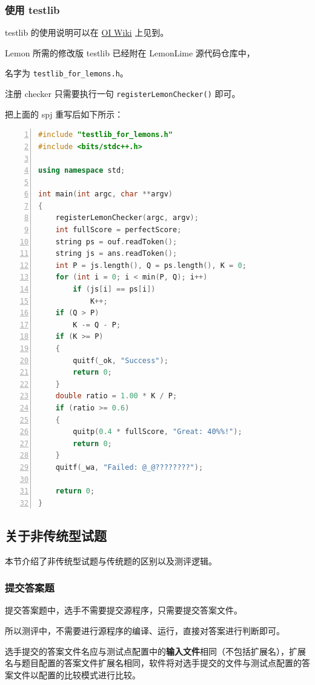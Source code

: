 \documentclass[UTF-8]{ctexart}
\begin{document}
			\subsubsection{使用 testlib}
			
				testlib 的使用说明可以在 \href{https://oi-wiki.org/intro/testlib/}{OI Wiki} 上见到。
				
				Lemon 所需的修改版 testlib 已经附在 LemonLime 源代码仓库中，
				
				名字为 \texttt{testlib\_for\_lemons.h}。
				
				注册 checker 只需要执行一句 \texttt{registerLemonChecker()} 即可。
				
				把上面的 spj 重写后如下所示：
		
				\begin{lstlisting}[language={C++},numbers=left,showspaces=false,showstringspaces=false,frame=shadowbox,basicstyle=\ttfamily]
#include "testlib_for_lemons.h"
#include <bits/stdc++.h>

using namespace std;

int main(int argc, char **argv)
{
	registerLemonChecker(argc, argv);
	int fullScore = perfectScore;
	string ps = ouf.readToken();
	string js = ans.readToken();
	int P = js.length(), Q = ps.length(), K = 0;
	for (int i = 0; i < min(P, Q); i++)
		if (js[i] == ps[i])
			K++;
	if (Q > P)
		K -= Q - P;
	if (K >= P)
	{
		quitf(_ok, "Success");
		return 0;
	}
	double ratio = 1.00 * K / P;
	if (ratio >= 0.6)
	{
		quitp(0.4 * fullScore, "Great: 40%%!");
		return 0;
	}
	quitf(_wa, "Failed: @_@????????");

	return 0;
}
				\end{lstlisting}
				
				
		\subsection{关于非传统型试题}
				
			本节介绍了非传统型试题与传统题的区别以及测评逻辑。
				
			\subsubsection{提交答案题}
				
				提交答案题中，选手不需要提交源程序，只需要提交答案文件。
				
				所以测评中，不需要进行源程序的编译、运行，直接对答案进行判断即可。
				
				选手提交的答案文件名应与测试点配置中的\textbf{输入文件}相同（不包括扩展名），扩展名与题目配置的答案文件扩展名相同，软件将对选手提交的文件与测试点配置的答案文件以配置的比较模式进行比较。
				
\end{document}
